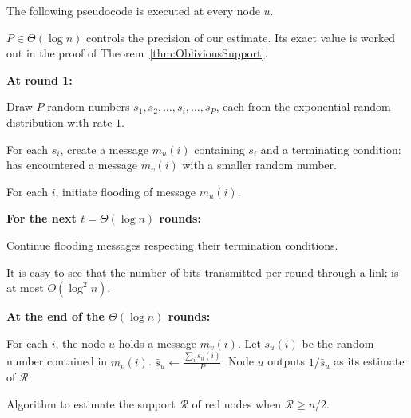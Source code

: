\documentclass[leqno,11pt]{article}
\renewcommand{\ge}{\geqslant}
\newcommand{\R}{{\mathcal{R}}}
\begin{document}
\begin{algorithm}[h]
  \begin{algorithmic}[1]
   \footnotesize
  \EMPTY The following pseudocode is executed at every node $u$.
  
  \EMPTY $P  \in \Theta(\log n)$ controls the precision of our estimate. Its exact value is worked
out in the proof of Theorem~\ref{thm:ObliviousSupport}.
 
   \EMPTY 
  \item[\bf At round 1:]
  
  \STATE  Draw $P$ random numbers $s_1, s_2, \ldots,
s_i, \ldots,  s_{P}$, each from the exponential random distribution with rate
$1$. 



\STATE For each $s_i$, create a message $m_u(i)$ containing $s_i$ and a terminating condition: {\sc has encountered
a message $m_v(i)$ with a smaller random number}.



\STATE For each $i$, initiate flooding of message $m_u(i)$.



   \EMPTY 
  \item[\bf For the next $t = \Theta(\log n)$ rounds:]
  
\STATE Continue flooding messages respecting their termination conditions.

\COMMENT It is easy to see that the number of bits transmitted per round through a link is at most $O(\log^2 n)$.

 \EMPTY 
  \item[\bf At the end of the $\Theta(\log n)$ rounds:]
  
   \STATE For each $i$, the node $u$ holds a message $m_v(i)$. Let $\bar{s}_u(i)$ be the random number contained in $m_v(i)$. 
   \STATE $\bar{s}_u \leftarrow \frac{\sum_i \bar{s}_u(i)}{P}$. \label{lno:bars}
   \STATE Node $u$ outputs $1/\bar{s}_u$ as its estimate of $\R$.
    \end{algorithmic}
  \caption{Algorithm to estimate the support $\R$ of red nodes when $\R \ge n/2$.}\label{alg:support}
\end{algorithm}
\normalsize
\end{document}
